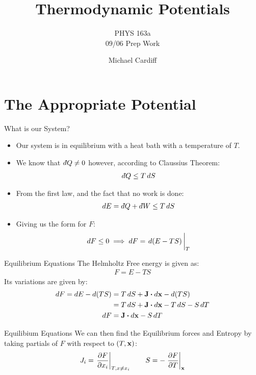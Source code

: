 \documentclass{beamer}
\title{Thermodynamic Potentials}
\author{Michael Cardiff}
\subtitle{PHYS 163a \\ 09/06 Prep Work}
\newcommand{\dbar}{d\hspace*{-0.08em}\bar{}\hspace*{0.1em}}
\begin{document}
\begin{frame}
  \titlepage
\end{frame}

\section{The Appropriate Potential}
\begin{frame}{What is our System?}
  \begin{itemize}
  \item Our system is in equilibrium with a heat bath with a temperature of $T$. 
  \item We know that $\dbar Q\neq0$ however, according to Claussius Theorem:
    \begin{align*}
      \dbar Q\leq T\dd{S}
    \end{align*}
  \item From the first law, and the fact that no work is done:
    \begin{align*}
      \dd{E}=\dbar Q+\dbar W\leq T\dd{S}
    \end{align*}
  \item Giving us the form for $F$:
    \begin{align*}
      \dd{F}\leq 0\implies \dd{F}=\eval{\dd{(E-TS)}}_{T}
    \end{align*}
  \end{itemize}
\end{frame}

\begin{frame}{Equilibrium Equations}
  The Helmholtz Free energy is given as:
  \begin{align*}
    F=E-TS
  \end{align*}
  Its variations are given by:
  \begin{align*}
    \dd{F}=\dd{E}-\dd{(TS)}&=T\dd{S}+\vb{J}\vdot\dd{\vb{x}}-\dd{(TS)}\\
    &=T\dd{S}+\vb{J}\vdot\dd{\vb{x}}-T\dd{S}-S\dd{T}\\
    \dd{F}&=\vb{J}\vdot\dd{\vb{x}}-S\dd{T}
  \end{align*}
\end{frame}
\begin{frame}{Equilibium Equations}
  We can then find the Equilibrium forces and Entropy by taking partials of $F$ with respect to $(T,\vb{x})$:
  \begin{align*}
    J_i=\eval{\pdv{F}{x_i}}_{T,x\neq x_i}\qquad S=-\eval{\pdv{F}{T}}_{\vb{x}}
  \end{align*}
\end{frame}
\end{document}
